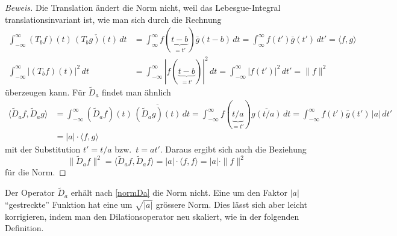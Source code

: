\begin{proof}[Beweis]
Die Translation ändert die Norm nicht, weil das Lebesgue-Integral 
translationsinvariant ist, wie man sich durch die Rechnung
\begin{align*}
\int_{-\infty}^\infty (T_bf)(t)\,\overline{(T_bg)(t)}\,dt
&=
\int_{\infty}^\infty f(\underbrace{t-b}_{\displaystyle=t'})\bar{g}(t-b)\,dt
=
\int_{\infty}^\infty f(t')\bar{g}(t')\,dt'
=
\langle f,g\rangle
\\
\int_{-\infty}^\infty |(T_bf)(t)|^2\,dt
&=
\int_{-\infty}^\infty |f(\underbrace{t-b}_{\displaystyle=t'})|^2\,dt
=
\int_{-\infty}^\infty |f(t')|^2\,dt'
=
\|f\|^2
\end{align*}
überzeugen kann.
Für $\tilde{D}_a$ findet man ähnlich
\begin{align*}
\langle \tilde{D}_af,\tilde{D}_ag\rangle
&=
\int_{-\infty}^\infty (\tilde{D}_af)(t)\,\overline{(\tilde{D}_ag)(t)}\,dt
=
\int_{-\infty}^\infty
f(\underbrace{t/a}_{\displaystyle=t'})
\overline{g(t/a)}
\,dt
=
\int_{-\infty}^\infty f(t')\bar{g}(t')\,|a|\,dt'
\\
&=
|a|\cdot \langle f,g\rangle
\end{align*}
mit der Substitution $t'=t/a$ bzw.~$t=at'$.
Daraus ergibt sich auch die Beziehung
\[
\|\tilde{D}_af\|^2
=
\langle \tilde{D}_af,\tilde{D}_af\rangle
=
|a|\cdot \langle f,f\rangle
=
|a|\cdot \|f\|^2
\]
für die Norm.
\end{proof}

Der Operator $\tilde{D}_a$ erhält nach \eqref{normDa} die Norm nicht.
Eine um den Faktor $|a|$ ``gestreckte'' Funktion hat eine um $\sqrt{|a|}$
grössere Norm.
Dies lässt sich aber leicht korrigieren, indem man den Dilationsoperator
neu skaliert, wie in der folgenden Definition.



